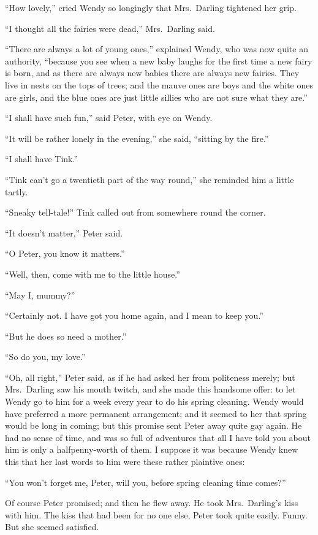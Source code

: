 ``How lovely,'' cried Wendy so longingly that Mrs.\ Darling tightened her
grip.

``I thought all the fairies were dead,'' Mrs.\ Darling said.

``There are always a lot of young ones,'' explained Wendy, who was now
quite an authority, ``because you see when a new baby laughs for the
first time a new fairy is born, and as there are always new babies
there are always new fairies. They live in nests on the tops of trees;
and the mauve ones are boys and the white ones are girls, and the blue
ones are just little sillies who are not sure what they are.''

``I shall have such fun,'' said Peter, with eye on Wendy.

``It will be rather lonely in the evening,'' she said, ``sitting by the
fire.''

``I shall have Tink.''

``Tink can't go a twentieth part of the way round,'' she reminded him a
little tartly.

``Sneaky tell-tale!'' Tink called out from somewhere round the corner.

``It doesn't matter,'' Peter said.

``O Peter, you know it matters.''

``Well, then, come with me to the little house.''

``May I, mummy?''

``Certainly not. I have got you home again, and I mean to keep you.''

``But he does so need a mother.''

``So do you, my love.''

``Oh, all right,'' Peter said, as if he had asked her from politeness
merely; but Mrs.\ Darling saw his mouth twitch, and she made this
handsome offer: to let Wendy go to him for a week every year to do his
spring cleaning. Wendy would have preferred a more permanent
arrangement; and it seemed to her that spring would be long in coming;
but this promise sent Peter away quite gay again. He had no sense of
time, and was so full of adventures that all I have told you about him
is only a halfpenny-worth of them. I suppose it was because Wendy knew
this that her last words to him were these rather plaintive ones:

``You won't forget me, Peter, will you, before spring cleaning time
comes?''

Of course Peter promised; and then he flew away. He took Mrs.\ Darling's
kiss with him. The kiss that had been for no one else, Peter took quite
easily. Funny. But she seemed satisfied.

